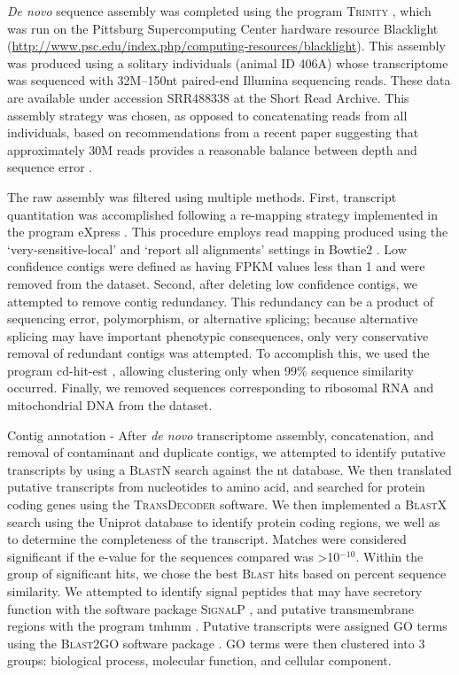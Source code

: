 \documentclass[10.5pt]{article}
\begin{document}
\textit{De novo} sequence assembly was completed using the program \textsc{Trinity} \citep{Grabherr:2011jb}, which was run on the Pittsburg Supercomputing Center hardware resource Blacklight (\url{http://www.psc.edu/index.php/computing-resources/blacklight}).  This assembly was produced using a solitary individuals (animal ID 406A) whose transcriptome was sequenced with 32M--150nt paired-end Illumina sequencing reads.  These data are available under accession SRR488338 at the Short Read Archive. This assembly strategy was chosen, as opposed to concatenating reads from all individuals, based on recommendations from a recent paper suggesting that approximately 30M reads provides a reasonable balance between depth and sequence error \citep{Francis:2013gc}.

The raw assembly was filtered using multiple methods. First, transcript quantitation was accomplished following a re-mapping strategy implemented in the program eXpress \citep{Roberts:2012dh}. This procedure employs read mapping produced using the ‘very-sensitive-local’ and ‘report all alignments’ settings in Bowtie2 \citep{Langmead:2012jh}.  Low confidence contigs were defined as having FPKM values less than 1 and were removed from the dataset. Second, after deleting low confidence contigs, we attempted to remove contig redundancy. This redundancy can be a product of sequencing error, polymorphism, or alternative splicing; because alternative splicing may have important phenotypic consequences, only very conservative removal of redundant contigs was attempted. To accomplish this, we used the program cd-hit-est \citep{Li:2006hr}, allowing clustering only when 99\% sequence similarity occurred. Finally, we removed sequences corresponding to ribosomal RNA and mitochondrial DNA from the dataset.   

Contig annotation - After \textit{de novo} transcriptome assembly, concatenation, and removal of contaminant and duplicate contigs, we attempted to identify putative transcripts by using a \textsc{BlastN} \citep{Camacho:2009fc} search against the nt database. We then translated putative transcripts from nucleotides to amino acid, and searched for protein coding genes using the \textsc{TransDecoder} software.  We then implemented a \textsc{BlastX} search using the Uniprot database to identify protein coding regions, we well as to determine the completeness of the transcript. Matches were considered significant if the e-value for the sequences compared was \textgreater 10$^{-10}$.  Within the group of significant hits, we chose the best \textsc{Blast} hits based on percent sequence similarity.  We attempted to identify signal peptides that may have secretory function with the software package \textsc{SignalP} \citep{Petersen:2011cn}, and putative transmembrane regions with the program tmhmm \citep{Krogh:2001bv}. Putative transcripts were assigned GO terms using the \textsc{Blast2GO} software package \citep{Conesa:2005hq}. GO terms were then clustered into 3 groups: biological process, molecular function, and cellular component.  
\end{document}
